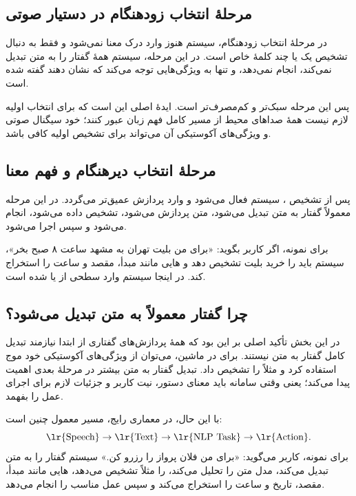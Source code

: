 \subsection{مرحلهٔ انتخاب زودهنگام در دستیار صوتی}
در مرحلهٔ انتخاب زودهنگام، سیستم هنوز وارد درک معنا نمی‌شود و فقط به دنبال تشخیص یک یا چند کلمهٔ خاص است. در این مرحله، سیستم همهٔ گفتار را به متن تبدیل نمی‌کند،  انجام نمی‌دهد، و تنها به ویژگی‌هایی توجه می‌کند که نشان دهند  گفته شده است.

پس این مرحله سبک‌تر و کم‌مصرف‌تر است. ایدهٔ اصلی این است که برای انتخاب اولیه لازم نیست همهٔ صداهای محیط از مسیر کامل فهم زبان عبور کنند؛ خود سیگنال صوتی و ویژگی‌های آکوستیکی آن می‌تواند برای تشخیص اولیه کافی باشد.

\subsection{مرحلهٔ انتخاب دیرهنگام و فهم معنا}
پس از تشخیص ، سیستم فعال می‌شود و وارد پردازش عمیق‌تر می‌گردد. در این مرحله معمولاً گفتار به متن تبدیل می‌شود، متن پردازش می‌شود،  تشخیص داده می‌شود،  انجام می‌شود و سپس  اجرا می‌شود.

برای نمونه، اگر کاربر بگوید: «برای من بلیت تهران به مشهد ساعت ۸ صبح بخر»، سیستم باید  را خرید بلیت تشخیص دهد و هایی مانند مبدأ، مقصد و ساعت را استخراج کند. در اینجا سیستم وارد سطحی از  یا  شده است.

\subsection{چرا گفتار معمولاً به متن تبدیل می‌شود؟}
در این بخش تأکید اصلی بر این بود که همهٔ پردازش‌های گفتاری از ابتدا نیازمند تبدیل کامل گفتار به متن نیستند. برای  در ماشین، می‌توان از ویژگی‌های آکوستیکی خود موج استفاده کرد و مثلاً  را تشخیص داد. تبدیل گفتار به متن بیشتر در مرحلهٔ بعدی اهمیت پیدا می‌کند؛ یعنی وقتی سامانه باید معنای دستور، نیت کاربر و جزئیات لازم برای اجرای عمل را بفهمد.

با این حال، در معماری رایج، مسیر معمول چنین است:
\[
\text{\lr{Speech}}\rightarrow \text{\lr{Text}}\rightarrow \text{\lr{NLP Task}}\rightarrow \text{\lr{Action}}.
\]
برای نمونه، کاربر می‌گوید: «برای من فلان پرواز را رزرو کن.» سیستم گفتار را به متن تبدیل می‌کند، مدل  متن را تحلیل می‌کند،  را مثلاً  تشخیص می‌دهد، هایی مانند مبدأ، مقصد، تاریخ و ساعت را استخراج می‌کند و سپس عمل مناسب را انجام می‌دهد.

